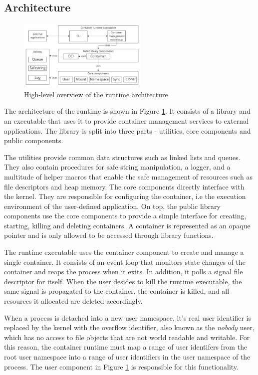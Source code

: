 \subsection{Architecture}
\label{ch:concept/runtime/architecture}
\begin{figure}[H]
    \centering
    \includegraphics[width=0.55\textwidth]{images/concept/runtime-arch-overview.jpg}
    \caption{High-level overview of the runtime architecture}
    \label{images:concept/runtime-arch-overview.jpg}
\end{figure}
The architecture of the runtime is shown in Figure \ref{images:concept/runtime-arch-overview.jpg}.
It consists of a library and an executable that uses it to provide container 
management services to external applications. The library is split into three parts - utilities,
core components and public components. 

The utilities provide common data structures such as 
linked lists and queues. They also contain procedures for safe string manipulation, a logger,
and a multitude of helper macros that enable the safe management of resources such as file descriptors 
and heap memory. The core components directly interface with the kernel. 
They are responsible for configuring the container, 
i.e the execution environment of the user-defined application. On top, the public library 
components use the core components to provide a 
simple interface for creating, starting, killing and deleting containers. A container 
is represented as an opaque pointer and is only allowed to be accessed through library functions.

The runtime executable uses the container component to create and manage a single container.
It consists of an event loop that monitors state changes of the container and reaps the process 
when it exits. In addition, it polls a signal file descriptor for itself. When the user desides 
to kill the runtime executable, the same signal is propagated to the container, the container 
is killed, and all resources it allocated are deleted accordingly. 

When a process is detached into a new user namespace, it's real user identifier is replaced by the kernel 
with the overflow identifier, also known as the \textit{nobody} user, which has no access to 
file objects that are not world readable and writable. 
For this reason, the container runtime must map a range of user identifers from the root user namespace 
into a range of user identifiers in the user namespace of the process. The user component in Figure 
\ref{images:concept/runtime-arch-overview.jpg} is responsible for this functionality. 


